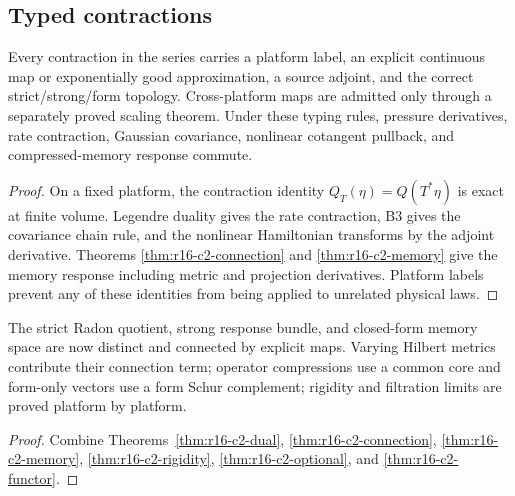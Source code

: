 \subsection{Typed contractions}

\begin{theorem}
\label{thm:r16-c2-functor}
Every contraction in the series carries a platform label, an explicit
continuous map or exponentially good approximation, a source adjoint, and the
correct strict/strong/form topology.  Cross-platform maps are admitted only
through a separately proved scaling theorem.  Under these typing rules,
pressure derivatives, rate contraction, Gaussian covariance, nonlinear
cotangent pullback, and compressed-memory response commute.
\end{theorem}

\begin{proof}
On a fixed platform, the contraction identity
\(Q_T(\eta)=Q(T^*\eta)\) is exact at finite volume.  Legendre duality gives the
rate contraction, B3 gives the covariance chain rule, and the nonlinear
Hamiltonian transforms by the adjoint derivative.  Theorems
\ref{thm:r16-c2-connection} and \ref{thm:r16-c2-memory} give the memory
response including metric and projection derivatives.  Platform labels
prevent any of these identities from being applied to unrelated physical
laws.
\end{proof}

\begin{theorem}
\label{thm:r16-c2-main}
The strict Radon quotient, strong response bundle, and closed-form memory space
are now distinct and connected by explicit maps.  Varying Hilbert metrics
contribute their connection term; operator compressions use a common core and
form-only vectors use a form Schur complement; rigidity and filtration limits
are proved platform by platform.
\end{theorem}

\begin{proof}
Combine Theorems~\ref{thm:r16-c2-dual},
\ref{thm:r16-c2-connection}, \ref{thm:r16-c2-memory},
\ref{thm:r16-c2-rigidity}, \ref{thm:r16-c2-optional}, and
\ref{thm:r16-c2-functor}.
\end{proof}
